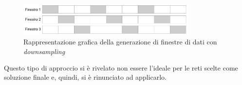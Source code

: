 \documentclass[12pt,a4paper,fleqn]{article}
\begin{document}
\begin{figure}
\centering
\includegraphics[width=0.8\textwidth]{images/windows.png}
\caption{Rappresentazione grafica della generazione di finestre di dati con \textsl{downsampling}}
\label{fig:finestre}
\end{figure}

Questo tipo di approccio si è rivelato non essere l'ideale per le reti scelte come soluzione finale e, quindi, si è rinunciato ad applicarlo.
\end{document}
